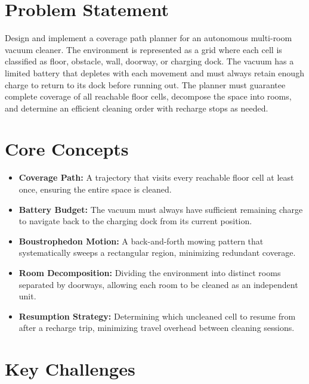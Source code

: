\section{Problem Statement}

Design and implement a coverage path planner for an autonomous multi-room vacuum cleaner. The environment is represented as a grid where each cell is classified as floor, obstacle, wall, doorway, or charging dock. The vacuum has a limited battery that depletes with each movement and must always retain enough charge to return to its dock before running out. The planner must guarantee complete coverage of all reachable floor cells, decompose the space into rooms, and determine an efficient cleaning order with recharge stops as needed.

\section{Core Concepts}

\begin{itemize}
  \item \textbf{Coverage Path:} A trajectory that visits every reachable floor cell at least once, ensuring the entire space is cleaned.
  \item \textbf{Battery Budget:} The vacuum must always have sufficient remaining charge to navigate back to the charging dock from its current position.
  \item \textbf{Boustrophedon Motion:} A back-and-forth mowing pattern that systematically sweeps a rectangular region, minimizing redundant coverage.
  \item \textbf{Room Decomposition:} Dividing the environment into distinct rooms separated by doorways, allowing each room to be cleaned as an independent unit.
  \item \textbf{Resumption Strategy:} Determining which uncleaned cell to resume from after a recharge trip, minimizing travel overhead between cleaning sessions.
\end{itemize}

\section{Key Challenges}

